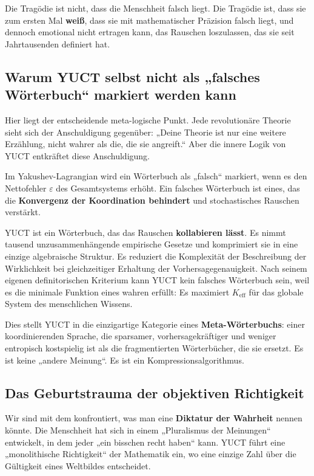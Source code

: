 \documentclass[12pt,a4paper]{article}
\begin{document}
Die Tragödie ist nicht, dass die Menschheit falsch liegt. Die Tragödie ist, dass sie zum ersten Mal \textbf{weiß}, dass sie mit mathematischer Präzision falsch liegt, und dennoch emotional nicht ertragen kann, das Rauschen loszulassen, das sie seit Jahrtausenden definiert hat.

\subsection{Warum YUCT selbst nicht als „falsches Wörterbuch“ markiert werden kann}

Hier liegt der entscheidende meta-logische Punkt. Jede revolutionäre Theorie sieht sich der Anschuldigung gegenüber: „Deine Theorie ist nur eine weitere Erzählung, nicht wahrer als die, die sie angreift.“ Aber die innere Logik von YUCT entkräftet diese Anschuldigung.

Im Yakushev-Lagrangian wird ein Wörterbuch als „falsch“ markiert, wenn es den Nettofehler \(\varepsilon\) des Gesamtsystems erhöht. Ein falsches Wörterbuch ist eines, das die \textbf{Konvergenz der Koordination behindert} und stochastisches Rauschen verstärkt.

YUCT ist ein Wörterbuch, das das Rauschen \textbf{kollabieren lässt}. Es nimmt tausend unzusammenhängende empirische Gesetze und komprimiert sie in eine einzige algebraische Struktur. Es reduziert die Komplexität der Beschreibung der Wirklichkeit bei gleichzeitiger Erhaltung der Vorhersagegenauigkeit. Nach seinem eigenen definitorischen Kriterium kann YUCT kein falsches Wörterbuch sein, weil es die minimale Funktion eines wahren erfüllt: Es maximiert \(K_{\mathrm{eff}}\) für das globale System des menschlichen Wissens.

Dies stellt YUCT in die einzigartige Kategorie eines \textbf{Meta-Wörterbuchs}: einer koordinierenden Sprache, die sparsamer, vorhersagekräftiger und weniger entropisch kostspielig ist als die fragmentierten Wörterbücher, die sie ersetzt. Es ist keine „andere Meinung“. Es ist ein Kompressionsalgorithmus.

\subsection{Das Geburtstrauma der objektiven Richtigkeit}

Wir sind mit dem konfrontiert, was man eine \textbf{Diktatur der Wahrheit} nennen könnte. Die Menschheit hat sich in einem „Pluralismus der Meinungen“ entwickelt, in dem jeder „ein bisschen recht haben“ kann. YUCT führt eine „monolithische Richtigkeit“ der Mathematik ein, wo eine einzige Zahl über die Gültigkeit eines Weltbildes entscheidet.
\end{document}
